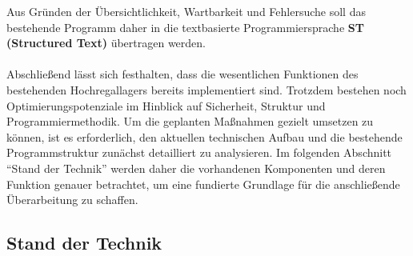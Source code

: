 Aus Gründen der Übersichtlichkeit, Wartbarkeit und Fehlersuche soll das bestehende Programm daher in die textbasierte Programmiersprache \textbf{ST (Structured Text)} übertragen werden.\\\\
Abschließend lässt sich festhalten, dass die wesentlichen Funktionen des bestehenden Hochregallagers bereits implementiert sind. 
Trotzdem bestehen noch Optimierungspotenziale im Hinblick auf Sicherheit, Struktur und Programmiermethodik. 
Um die geplanten Maßnahmen gezielt umsetzen zu können, ist es erforderlich, den aktuellen technischen Aufbau und die bestehende Programmstruktur zunächst detailliert zu analysieren. 
Im folgenden Abschnitt \enquote{Stand der Technik} werden daher die vorhandenen Komponenten und deren Funktion genauer betrachtet, um eine fundierte Grundlage für die anschließende Überarbeitung zu schaffen.
\subsection{Stand der Technik}
\label{cha:Stand der Technik}



